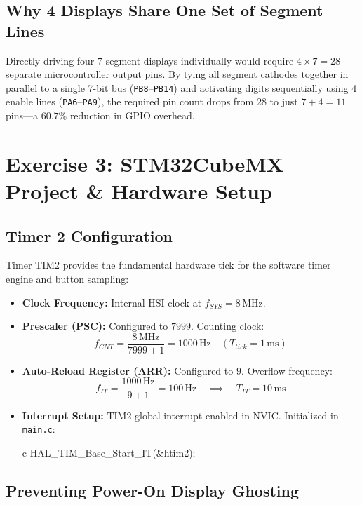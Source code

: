 \documentclass{hcmut-report}
\begin{document}
\subsection{Why 4 Displays Share One Set of Segment Lines}
Directly driving four 7-segment displays individually would require $4 \times 7 = 28$ separate microcontroller output pins. By tying all segment cathodes together in parallel to a single 7-bit bus (\texttt{PB8}--\texttt{PB14}) and activating digits sequentially using 4 enable lines (\texttt{PA6}--\texttt{PA9}), the required pin count drops from 28 to just $7 + 4 = 11$ pins---a $60.7\%$ reduction in GPIO overhead.


\newpage
\section{Exercise 3: STM32CubeMX Project \& Hardware Setup}

\subsection{Timer 2 Configuration}
Timer TIM2 provides the fundamental hardware tick for the software timer engine and button sampling:
\begin{itemize}
    \item \textbf{Clock Frequency:} Internal HSI clock at $f_{SYS} = 8\,\text{MHz}$.
    \item \textbf{Prescaler (PSC):} Configured to $7999$. Counting clock:
    \begin{equation}
        f_{CNT} = \frac{8\,\text{MHz}}{7999 + 1} = 1000\,\text{Hz} \quad (T_{tick} = 1\,\text{ms})
    \end{equation}
    \item \textbf{Auto-Reload Register (ARR):} Configured to $9$. Overflow frequency:
    \begin{equation}
        f_{IT} = \frac{1000\,\text{Hz}}{9 + 1} = 100\,\text{Hz} \quad \implies \quad T_{IT} = 10\,\text{ms}
    \end{equation}
    \item \textbf{Interrupt Setup:} TIM2 global interrupt enabled in NVIC. Initialized in \texttt{main.c}:
    \begin{code}{c}
    HAL_TIM_Base_Start_IT(&htim2);
    \end{code}
\end{itemize}

\subsection{Preventing Power-On Display Ghosting}
\end{document}

